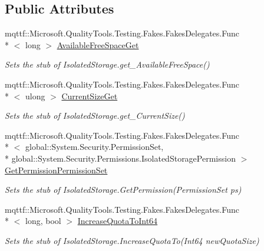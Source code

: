\subsection*{Public Attributes}
\begin{DoxyCompactItemize}
\item 
mqttf\-::\-Microsoft.\-Quality\-Tools.\-Testing.\-Fakes.\-Fakes\-Delegates.\-Func\\*
$<$ long $>$ \hyperlink{class_system_1_1_i_o_1_1_isolated_storage_1_1_fakes_1_1_stub_isolated_storage_a89dbabb6dbe2a6563c0cd0482e111fbc}{Available\-Free\-Space\-Get}
\begin{DoxyCompactList}\small\item\em Sets the stub of Isolated\-Storage.\-get\-\_\-\-Available\-Free\-Space()\end{DoxyCompactList}\item 
mqttf\-::\-Microsoft.\-Quality\-Tools.\-Testing.\-Fakes.\-Fakes\-Delegates.\-Func\\*
$<$ ulong $>$ \hyperlink{class_system_1_1_i_o_1_1_isolated_storage_1_1_fakes_1_1_stub_isolated_storage_aecbe0c30c6435097313681cbb71dfb16}{Current\-Size\-Get}
\begin{DoxyCompactList}\small\item\em Sets the stub of Isolated\-Storage.\-get\-\_\-\-Current\-Size()\end{DoxyCompactList}\item 
mqttf\-::\-Microsoft.\-Quality\-Tools.\-Testing.\-Fakes.\-Fakes\-Delegates.\-Func\\*
$<$ global\-::\-System.\-Security.\-Permission\-Set, \\*
global\-::\-System.\-Security.\-Permissions.\-Isolated\-Storage\-Permission $>$ \hyperlink{class_system_1_1_i_o_1_1_isolated_storage_1_1_fakes_1_1_stub_isolated_storage_a889a33a186b23ca8b266137b127138d4}{Get\-Permission\-Permission\-Set}
\begin{DoxyCompactList}\small\item\em Sets the stub of Isolated\-Storage.\-Get\-Permission(\-Permission\-Set ps)\end{DoxyCompactList}\item 
mqttf\-::\-Microsoft.\-Quality\-Tools.\-Testing.\-Fakes.\-Fakes\-Delegates.\-Func\\*
$<$ long, bool $>$ \hyperlink{class_system_1_1_i_o_1_1_isolated_storage_1_1_fakes_1_1_stub_isolated_storage_a36e9c3260161572a9d957cd2905ff209}{Increase\-Quota\-To\-Int64}
\begin{DoxyCompactList}\small\item\em Sets the stub of Isolated\-Storage.\-Increase\-Quota\-To(\-Int64 new\-Quota\-Size)\end{DoxyCompactList}\item 

\end{DoxyCompactItemize}
